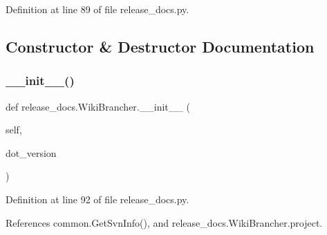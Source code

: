 Definition at line 89 of file release\+\_\+docs.\+py.



\subsection{Constructor \& Destructor Documentation}
\mbox{\label{classrelease__docs_1_1WikiBrancher_a344b32e2b65f0e8bab9fbf1e670d33fd}} 
\subsubsection{\texorpdfstring{\+\_\+\+\_\+init\+\_\+\+\_\+()}{\_\_init\_\_()}}
{\footnotesize\ttfamily def release\+\_\+docs.\+Wiki\+Brancher.\+\_\+\+\_\+init\+\_\+\+\_\+ (\begin{DoxyParamCaption}\item[{}]{self,  }\item[{}]{dot\+\_\+version }\end{DoxyParamCaption})}



Definition at line 92 of file release\+\_\+docs.\+py.



References common.\+Get\+Svn\+Info(), and release\+\_\+docs.\+Wiki\+Brancher.\+project.


